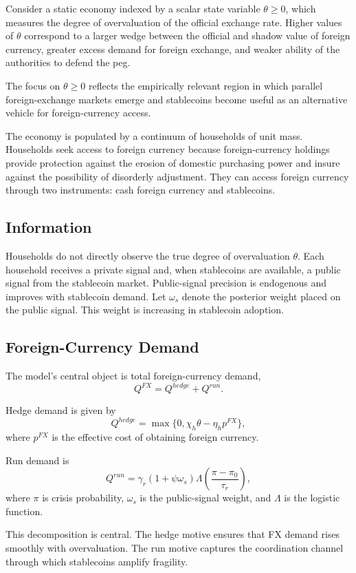 \documentclass[12pt]{article}
\begin{document}
Consider a static economy indexed by a scalar state variable $\theta \ge 0$, which measures the degree of overvaluation of the official exchange rate. Higher values of $\theta$ correspond to a larger wedge between the official and shadow value of foreign currency, greater excess demand for foreign exchange, and weaker ability of the authorities to defend the peg.

The focus on $\theta \ge 0$ reflects the empirically relevant region in which parallel foreign-exchange markets emerge and stablecoins become useful as an alternative vehicle for foreign-currency access.

The economy is populated by a continuum of households of unit mass. Households seek access to foreign currency because foreign-currency holdings provide protection against the erosion of domestic purchasing power and insure against the possibility of disorderly adjustment. They can access foreign currency through two instruments: cash foreign currency and stablecoins.

\subsection{Information}

Households do not directly observe the true degree of overvaluation $\theta$. Each household receives a private signal and, when stablecoins are available, a public signal from the stablecoin market. Public-signal precision is endogenous and improves with stablecoin demand. Let $\omega_s$ denote the posterior weight placed on the public signal. This weight is increasing in stablecoin adoption.

\subsection{Foreign-Currency Demand}

The model's central object is total foreign-currency demand,
\[
Q^{FX} = Q^{hedge} + Q^{run}.
\]

Hedge demand is given by
\[
Q^{hedge} = \max\{0,\chi_h \theta - \eta_h p^{FX}\},
\]
where $p^{FX}$ is the effective cost of obtaining foreign currency.

Run demand is
\[
Q^{run} = \gamma_r (1+\psi \omega_s)\Lambda\left(\frac{\pi-\pi_0}{\tau_r}\right),
\]
where $\pi$ is crisis probability, $\omega_s$ is the public-signal weight, and $\Lambda$ is the logistic function.

This decomposition is central. The hedge motive ensures that FX demand rises smoothly with overvaluation. The run motive captures the coordination channel through which stablecoins amplify fragility.
\end{document}

